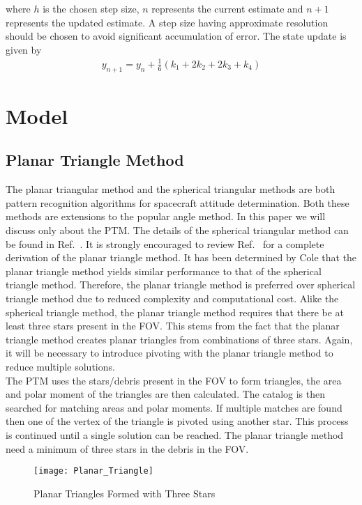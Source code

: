 \documentclass[]{aiaa-tc}%
\begin{document}
where $h$ is the chosen step size, $n$ represents the current estimate and $n+1$ represents the updated estimate. A step size having approximate resolution should be chosen to avoid significant accumulation of error. The state update is given by
\begin{align}
y_{n+1}=y_n+\frac{1}{6}(k_1+2k_2+2k_3+k_4)
\end{align}
\section{Model}
\label{model}

\subsection{Planar Triangle Method}

The planar triangular method and the spherical triangular methods are both pattern recognition algorithms for spacecraft attitude determination. Both these methods are extensions to the popular angle method. In this paper we will discuss only about the PTM. The details of the spherical triangular method can be found in Ref.~. It is strongly encouraged to review Ref.~ for a complete derivation of the planar triangle method. It has been determined by Cole that the planar triangle method yields similar performance to that of the spherical triangle method\cite{PTM}. Therefore, the planar triangle method is preferred over spherical triangle method due to reduced complexity and computational cost. Alike the spherical triangle method, the planar triangle method requires that there be at least three stars present in the FOV. This stems from the fact that the planar triangle method creates planar triangles from combinations of three stars. Again, it will be necessary to introduce pivoting with the planar triangle method to reduce multiple solutions.\\

The PTM uses the stars/debris present in the FOV to form triangles, the area and polar moment of the triangles are then calculated. The catalog is then searched for matching areas and polar moments. If multiple matches are found then one of the vertex of the triangle is pivoted using another star. This process is continued until a single solution can be reached. The planar triangle method need a minimum of three stars in the debris in the FOV.

\begin{figure}[t]
\label{triangles_with_Stars}
\centering
\texttt{[image: Planar\_Triangle]}
\caption{ Planar Triangles Formed with Three Stars}
\end{figure}
\end{document}
